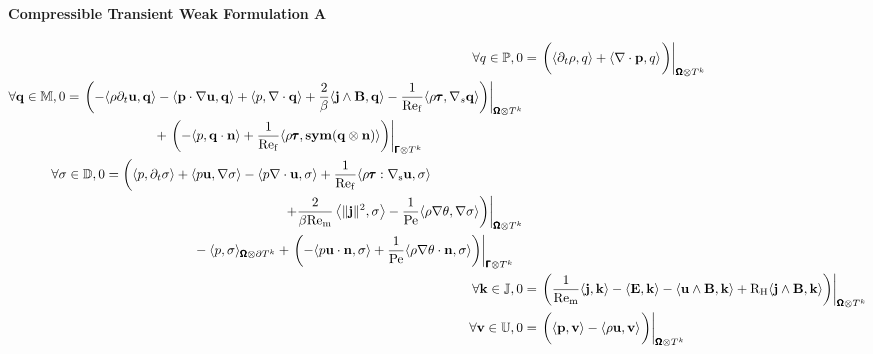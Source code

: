     \paragraph*{Compressible Transient Weak Formulation A}
    \begin{align}
        \forall q \in \bbP,  0  &=  \left.\left(\langle\partial_{t}\rho, q\rangle + \langle\nabla\cdot\bfp, q\rangle\tall\right)\right|_{\bfOmega\otimes T^{k}}  \\
        \begin{split}
            \forall \bfq \in \bbM,  0  &=  \left.\left(- \langle\rho\partial_{t}\bfu, \bfq\rangle - \langle\bfp\cdot\nabla\bfu, \bfq\rangle + \langle p, \nabla\cdot\bfq\rangle + \frac{2}{\beta}\langle\bfj\wedge\bfB, \bfq\rangle - \frac{1}{\rmRef}\langle\rho\bftau, \nabla_{s}\bfq\rangle\right)\right|_{\bfOmega\otimes T^{k}}  \\
            &\;\;\;\;\;\;\;\;\;\;\;\;\;\;\;\;\;\;\;\;\;\;\;\;  + \left.\left(- \langle p, \bfq\cdot\bfn\rangle + \frac{1}{\rmRef}\langle\rho\bftau, \sym(\bfq\otimes\bfn)\rangle\right)\right|_{\bfGamma\otimes T^{k}}
        \end{split}  \\
        \begin{split}
            \forall \sigma \in \bbD,  0  &=  \left(\langle p, \partial_{t}\sigma\rangle + \langle p\bfu, \nabla\sigma\rangle - \langle p\nabla\cdot\bfu, \sigma\rangle + \frac{1}{\rmRef}\langle\rho\bftau:\nabla_{\rms}\bfu, \sigma\rangle\right.  \\
            &\;\;\;\;\;\;\;\;\;\;\;\;\;\;\;\;\;\;\;\;\;\;\;\;\;\;\;\;\;\;\;\;\;\;\;\;\;\;\;\;\;\;\;\;\;\;\;\;\left.\left.+ \frac{2}{\beta\rmRem}\left\langle\|\bfj\|^{2}, \sigma\right\rangle - \frac{1}{\rmPe}\langle\rho\nabla\theta, \nabla\sigma\rangle\right)\right|_{\bfOmega\otimes T^{k}}  \\
            &\;\;\;\;\;\;\;\;\;\;\;\;\;\;\;\;\;\;\;\;\;\;\;\;- \langle p, \sigma\rangle_{\bfOmega\otimes\partial T^{k}} + \left.\left(- \langle p\bfu\cdot\bfn, \sigma\rangle + \frac{1}{\rmPe}\langle\rho\nabla\theta\cdot\bfn, \sigma\rangle\right)\right|_{\bfGamma\otimes T^{k}}
        \end{split}  \\
        \forall \bfk \in \bbJ,  0  &=  \left.\left(\frac{1}{\rmRem}\langle\bfj, \bfk\rangle - \langle\bfE, \bfk\rangle - \langle\bfu\wedge\bfB, \bfk\rangle + \rmRH\langle\bfj\wedge\bfB, \bfk\rangle\right)\right|_{\bfOmega\otimes T^{k}}  \\
        \forall \bfv \in \bbU,  0  &=  \left.\left(\langle\bfp, \bfv\rangle - \langle\rho\bfu, \bfv\rangle\tall\right)\right|_{\bfOmega\otimes T^{k}}  \\

\end{align}

